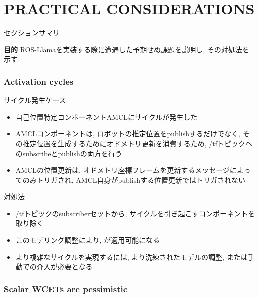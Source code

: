
\section{PRACTICAL CONSIDERATIONS}
\label{sec: practical considerations}

\begin{frame}{セクションサマリ}
    \begin{itembox}[l]{\textbf{目的}}
        ROS-Llamaを実装する際に遭遇した予期せぬ課題を説明し, その対処法を示す
    \end{itembox}
\end{frame}


\subsubsection{Activation cycles}
\label{sssec: activation cycles}

\begin{frame}{サイクル発生ケース}
    \begin{itemize}
        \item 自己位置特定コンポーネントAMCLにサイクルが発生した
        \item AMCLコンポーネントは, ロボットの推定位置をpublishするだけでなく, その推定位置を生成するためにオドメトリ更新を消費するため, /tfトピックへのsubscribeとpublishの両方を行う
        \item AMCLの位置更新は, オドメトリ座標フレームを更新するメッセージによってのみトリガされ, AMCL自身がpublishする位置更新ではトリガされない
    \end{itemize}
\end{frame}

\begin{frame}{対処法}
    \begin{itemize}
        \item /tfトピックのsubscriberセットから, サイクルを引き起こすコンポーネントを取り除く
        \item このモデリング調整により, が適用可能になる
        \item より複雑なサイクルを実現するには, より洗練されたモデルの調整, または手動での介入が必要となる
    \end{itemize}
\end{frame}


\subsubsection{Scalar WCETs are pessimistic}
\label{sssec: scalar wcets are pessimistic}

